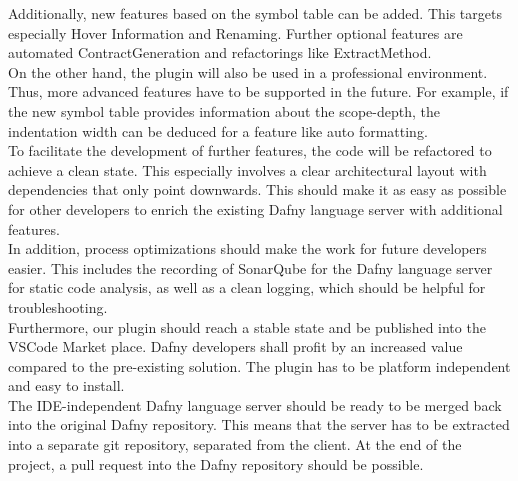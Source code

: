 Additionally, new features based on the symbol table can be added.
This targets especially Hover Information and Renaming.
Further optional features are automated ContractGeneration and refactorings like ExtractMethod. \\

On the other hand, the plugin will also be used in a professional environment.
Thus, more advanced features have to be supported in the future.
For example, if the new symbol table provides information about the scope-depth, the indentation width can be deduced for a feature like auto formatting.\\

To facilitate the development of further features, the code will be refactored to achieve a clean state.
This especially involves a clear architectural layout with dependencies that only point downwards.
This should make it as easy as possible for other developers to enrich the existing Dafny language server with additional features. \\

In addition, process optimizations should make the work for future developers easier.
This includes the recording of SonarQube for the Dafny language server for static code analysis,
as well as a clean logging,
which should be helpful for troubleshooting. \\

Furthermore, our plugin should reach a stable state and be published into the VSCode Market place.
Dafny developers shall profit by an increased value compared to the pre-existing solution.
The plugin has to be platform independent and easy to install. \\

The IDE-independent Dafny language server should be ready to be merged back into the original Dafny repository.
This means that the server has to be extracted into a separate git repository, separated from the client.
At the end of the project, a pull request into the Dafny repository should be possible.
